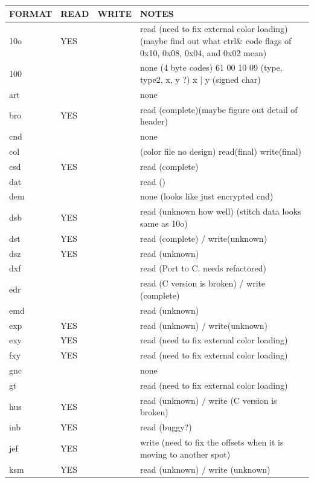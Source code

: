 \documentclass[a4paper, 11pt]{report}
\begin{document}
\begin{longtable}{l l l p{8cm}}
FORMAT & READ & WRITE & NOTES \\
\hline
10o    & YES   &       & read (need to fix external color loading) (maybe find out what ctrl\& code flags of 0x10, 0x08, 0x04, and 0x02 mean) \\
100    &       &       & none (4 byte codes) 61 00 10 09 (type, type2, x, y ?) x | y (signed char) \\
art    &       &       & none \\
bro    & YES   &       & read (complete)(maybe figure out detail of header) \\
cnd    &       &       & none \\
col    &       &       & (color file no design) read(final) write(final) \\
csd    & YES   &       & read (complete) \\
dat    &       &       & read () \\
dem    &       &       & none (looks like just encrypted cnd) \\
dsb    & YES   &       & read (unknown how well) (stitch data looks same as 10o) \\
dst    & YES   &       & read (complete) / write(unknown) \\
dsz    & YES   &       & read (unknown) \\
dxf    &       &       & read (Port to C. needs refactored) \\
edr    &       &       & read (C version is broken) / write (complete) \\
emd    &       &       & read (unknown) \\
exp    & YES   &       & read (unknown) / write(unknown) \\
exy    & YES   &       & read (need to fix external color loading) \\
fxy    & YES   &       & read (need to fix external color loading) \\
gnc    &       &       & none \\
gt     &       &       & read (need to fix external color loading) \\
hus    & YES   &       & read (unknown) / write (C version is broken) \\
inb    & YES   &       & read (buggy?) \\
jef    & YES   &       & write (need to fix the offsets when it is moving to another spot) \\
ksm    & YES   &       & read (unknown) / write (unknown) \\

\end{longtable}
\end{document}

